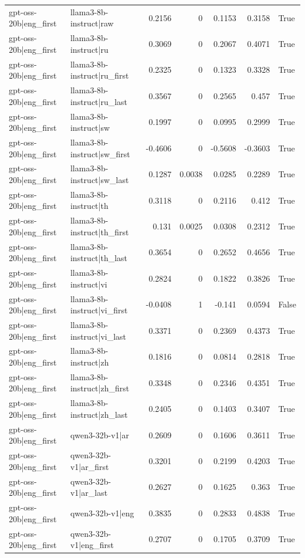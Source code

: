 \begin{table}
\begin{tabular}{l l r r r r l}
gpt-oss-20b|eng_first & llama3-8b-instruct|raw & 0.2156 & 0 & 0.1153 & 0.3158 & True \\
gpt-oss-20b|eng_first & llama3-8b-instruct|ru & 0.3069 & 0 & 0.2067 & 0.4071 & True \\
gpt-oss-20b|eng_first & llama3-8b-instruct|ru_first & 0.2325 & 0 & 0.1323 & 0.3328 & True \\
gpt-oss-20b|eng_first & llama3-8b-instruct|ru_last & 0.3567 & 0 & 0.2565 & 0.457 & True \\
gpt-oss-20b|eng_first & llama3-8b-instruct|sw & 0.1997 & 0 & 0.0995 & 0.2999 & True \\
gpt-oss-20b|eng_first & llama3-8b-instruct|sw_first & -0.4606 & 0 & -0.5608 & -0.3603 & True \\
gpt-oss-20b|eng_first & llama3-8b-instruct|sw_last & 0.1287 & 0.0038 & 0.0285 & 0.2289 & True \\
gpt-oss-20b|eng_first & llama3-8b-instruct|th & 0.3118 & 0 & 0.2116 & 0.412 & True \\
gpt-oss-20b|eng_first & llama3-8b-instruct|th_first & 0.131 & 0.0025 & 0.0308 & 0.2312 & True \\
gpt-oss-20b|eng_first & llama3-8b-instruct|th_last & 0.3654 & 0 & 0.2652 & 0.4656 & True \\
gpt-oss-20b|eng_first & llama3-8b-instruct|vi & 0.2824 & 0 & 0.1822 & 0.3826 & True \\
gpt-oss-20b|eng_first & llama3-8b-instruct|vi_first & -0.0408 & 1 & -0.141 & 0.0594 & False \\
gpt-oss-20b|eng_first & llama3-8b-instruct|vi_last & 0.3371 & 0 & 0.2369 & 0.4373 & True \\
gpt-oss-20b|eng_first & llama3-8b-instruct|zh & 0.1816 & 0 & 0.0814 & 0.2818 & True \\
gpt-oss-20b|eng_first & llama3-8b-instruct|zh_first & 0.3348 & 0 & 0.2346 & 0.4351 & True \\
gpt-oss-20b|eng_first & llama3-8b-instruct|zh_last & 0.2405 & 0 & 0.1403 & 0.3407 & True \\
gpt-oss-20b|eng_first & qwen3-32b-v1|ar & 0.2609 & 0 & 0.1606 & 0.3611 & True \\
gpt-oss-20b|eng_first & qwen3-32b-v1|ar_first & 0.3201 & 0 & 0.2199 & 0.4203 & True \\
gpt-oss-20b|eng_first & qwen3-32b-v1|ar_last & 0.2627 & 0 & 0.1625 & 0.363 & True \\
gpt-oss-20b|eng_first & qwen3-32b-v1|eng & 0.3835 & 0 & 0.2833 & 0.4838 & True \\
gpt-oss-20b|eng_first & qwen3-32b-v1|eng_first & 0.2707 & 0 & 0.1705 & 0.3709 & True \\

\end{tabular}
\end{table}
